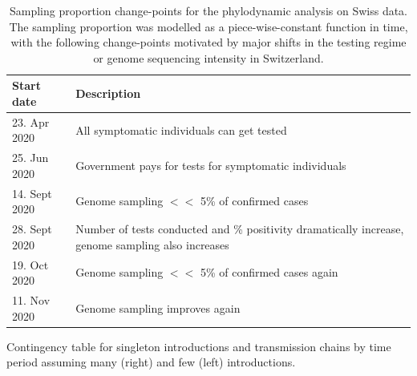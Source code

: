 \documentclass[9pt,twoside,lineno]{pnas-new}
\begin{document}
\begin{table}[h!]
\caption{Sampling proportion change-points for the phylodynamic analysis on Swiss data. The sampling proportion was modelled as a piece-wise-constant function in time, with the following change-points motivated by major shifts in the testing regime or genome sequencing intensity in Switzerland.}
\label{tab:CHE_samp_prob_change_dates}
\begin{tabular}{ll}
\hline
Start date & Description \\
\hline
23. Apr 2020 & All symptomatic individuals can get tested \\
25. Jun 2020 & Government pays for tests for symptomatic individuals \\
14. Sept 2020 & Genome sampling $<<$ 5\% of confirmed cases \\
28. Sept 2020 & Number of tests conducted and \% positivity dramatically increase, genome sampling also increases \\
19. Oct 2020 & Genome sampling $<<$ 5\% of confirmed cases again \\
11. Nov 2020 & Genome sampling improves again \\
\hline
\end{tabular}
\end{table}

\begin{table}[h!]
\caption{Contingency table for singleton introductions and transmission chains by time period assuming many (right) and few (left)  introductions.}
\label{tab:lockdown-contingency}


\end{table}





\end{document}
